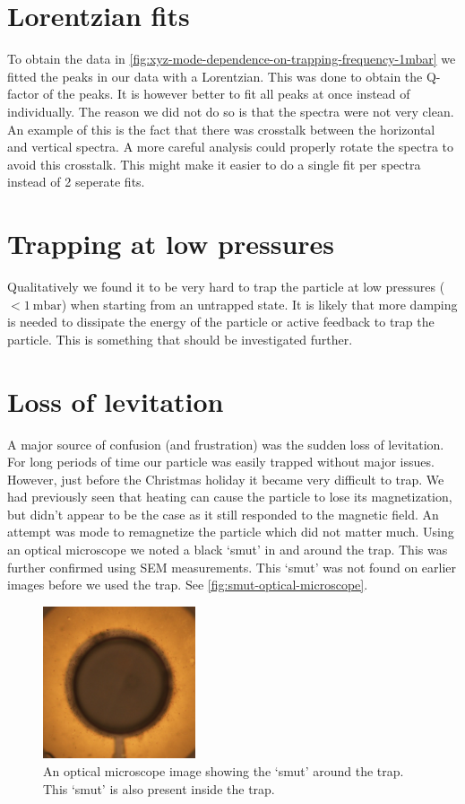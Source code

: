 \section*{Lorentzian fits}
To obtain the data in \autoref{fig:xyz-mode-dependence-on-trapping-frequency-1mbar} we fitted the peaks in our data with a Lorentzian. This was done to obtain the Q-factor of the peaks. It is however better to fit all peaks at once instead of individually. The reason we did not do so is that the spectra were not very clean. An example of this is the fact that there was crosstalk between the horizontal and vertical spectra. A more careful analysis could properly rotate the spectra to avoid this crosstalk. This might make it easier to do a single fit per spectra instead of 2 seperate fits.

\section*{Trapping at low pressures}
Qualitatively we found it to be very hard to trap the particle at low pressures ($<\qty{1}{\milli\bar}$) when starting from an untrapped state. It is likely that more damping is needed to dissipate the energy of the particle or active feedback to trap the particle. This is something that should be investigated further.

\section*{Loss of levitation}
A major source of confusion (and frustration) was the sudden loss of levitation. For long periods of time our particle was easily trapped without major issues. However, just before the Christmas holiday it became very difficult to trap. We had previously seen that heating can cause the particle to lose its magnetization, but didn't appear to be the case as it still responded to the magnetic field. An attempt was mode to remagnetize the particle which did not matter much. Using an optical microscope we noted a black `smut' in and around the trap. This was further confirmed using SEM measurements. This `smut' was not found on earlier images before we used the trap. See \autoref{fig:smut-optical-microscope}.

\begin{figure}
    \centering
    \includegraphics[width=0.4\textwidth]{figures/sample/dirt_optical_microscope.jpeg}
    \caption{An optical microscope image showing the `smut' around the trap. This `smut' is also present inside the trap.}
    \label{fig:smut-optical-microscope}
\end{figure}

